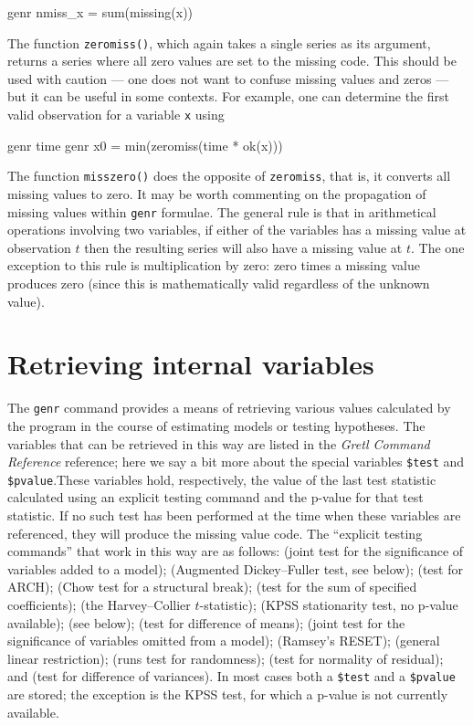 \begin{code}
      genr nmiss_x = sum(missing(x))
\end{code}

The function \verb+zeromiss()+, which again takes a single series as
its argument, returns a series where all zero values are set to the
missing code.  This should be used with caution --- one does not want
to confuse missing values and zeros --- but it can be useful in some
contexts.  For example, one can determine the first valid observation
for a variable \verb+x+ using

\begin{code}
      genr time
      genr x0 = min(zeromiss(time * ok(x)))
\end{code}

The function \verb+misszero()+ does the opposite of \verb+zeromiss+,
that is, it converts all missing values to zero.  It may be worth
commenting on the propagation of missing values within \verb+genr+
formulae.  The general rule is that in arithmetical operations
involving two variables, if either of the variables has a missing
value at observation $t$ then the resulting series will also have a
missing value at $t$.  The one exception to this rule is
multiplication by zero: zero times a missing value produces zero
(since this is mathematically valid regardless of the unknown value).
    

\section{Retrieving internal variables}
\label{genr-internal}

The \verb+genr+ command provides a means of retrieving various values
calculated by the program in the course of estimating models or
testing hypotheses.  The variables that can be retrieved in this way
are listed in the \emph{Gretl Command Reference} reference; here we
say a bit more about the special variables \verb+$test+ and
\verb+$pvalue+.These variables hold, respectively, the value of the
last test statistic calculated using an explicit testing command and
the p-value for that test statistic.  If no such test has been
performed at the time when these variables are referenced, they will
produce the missing value code.  The ``explicit testing commands''
that work in this way are as follows:  (joint test for the
significance of variables added to a model);  (Augmented
Dickey--Fuller test, see below);  (test for ARCH);
 (Chow test for a structural break);  (test
for the sum of specified coefficients);  (the
Harvey--Collier $t$-statistic);  (KPSS stationarity test, no
p-value available);  (see below);  (test for
difference of means);  (joint test for the significance of
variables omitted from a model);  (Ramsey's RESET);
 (general linear restriction);  (runs test for
randomness);  (test for normality of residual); and
 (test for difference of variances). In most cases both a
\verb+$test+ and a \verb+$pvalue+ are stored; the exception is the
KPSS test, for which a p-value is not currently available.
    
